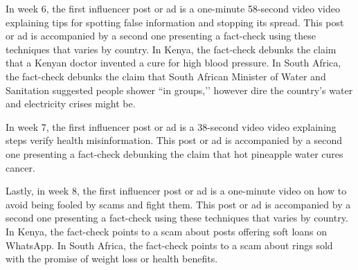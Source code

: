 In week 6, the first influencer post or ad is a one-minute 58-second video video explaining tips for spotting false information and stopping its spread.
This post or ad is accompanied by a second one presenting a fact-check using these techniques that varies by country. In Kenya, the fact-check debunks the claim that a Kenyan doctor invented a cure for high blood pressure. In South Africa, the fact-check debunks the claim that South African Minister of Water and Sanitation suggested people shower ``in groups,'’ however dire the country’s water and electricity crises might be. 

In week 7, the first influencer post or ad is a 38-second video video explaining steps verify health misinformation.
This post or ad is accompanied by a second one presenting a fact-check debunking the claim that hot pineapple water cures cancer.

Lastly, in week 8, the first influencer post or ad is a one-minute video on how to avoid being fooled by scams and fight them.
This post or ad is accompanied by a second one presenting a fact-check using these techniques that varies by country. In Kenya, the fact-check points to a scam about posts offering soft loans on WhatsApp. In South Africa, the fact-check points to a scam about rings sold with the promise of weight loss or health benefits. 


